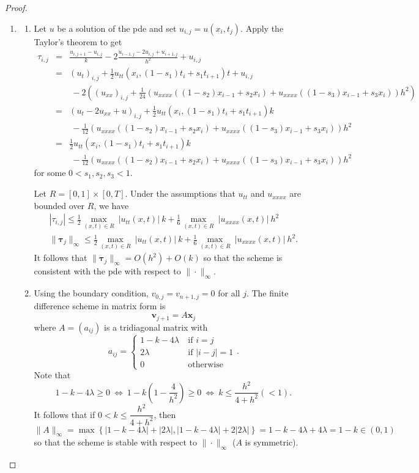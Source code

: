 \documentclass[a4paper,12pt]{article}
\begin{document}
\begin{enumerate}
\begin{proof}
\begin{enumerate}
\item 
\begin{enumerate}[label=(\roman*)]
\item Let $u$ be a solution of the pde and set $u_{i,j}=u(x_i,t_j)$. Apply the Taylor's theorem to get
\begin{eqnarray*}
\tau_{i,j} &=& \frac{u_{i,j+1}-u_{i,j}}k - 2 \frac{u_{i-1,j}-2u_{i,j}+u_{i+1,j}}{h^2} + u_{i,j}\\
&=& (u_t)_{i,j} + \frac 12 u_{tt}(x_i,(1-s_1)t_i+s_1t_{i+1}) t  + u_{i,j} \\
&&\ - 2 \left( 
(u_{xx})_{i,j} + \frac 1{24} \left( u_{xxxx}((1-s_2)x_{i-1}+s_2x_i) + u_{xxxx}((1-s_3)x_{i-1}+s_3x_i) \right) h^2 \right)\\
&=& (u_t-2u_{xx}+u)_{i,j} + \frac 12 u_{tt}(x_i,(1-s_1)t_i+s_1t_{i+1}) k\\
&&\ - \frac 1{12} \left( u_{xxxx}((1-s_2)x_{i-1}+s_2 x_i) + u_{xxxx}((1-s_3)x_{i-1}+s_3 x_i) \right) h^2 \\
&=& \frac 12 u_{tt}(x_i,(1-s_1)t_i+s_1t_{i+1}) k\\
&&\ - \frac 1{12} \left( u_{xxxx}((1-s_2)x_{i-1}+s_2 x_i) + u_{xxxx}((1-s_3)x_{i-1}+s_3 x_i) \right) h^2
\end{eqnarray*}
for some $0 < s_1,s_2,s_3 < 1$.

Let $R=[0,1]\times[0,T]$. Under the assumptions that $u_{tt}$ and $u_{xxxx}$ are bounded over $R$, we have
\begin{gather*}
|\tau_{i,j}| \le \frac 12 \max_{(x,t)\in R}\ |u_{tt}(x,t)|\ k + \frac 16 \max_{(x,t)\in R}\ |u_{xxxx}(x,t)|\ h^2\\
\|\boldsymbol\tau_j\|_\infty \le \frac 12 \max_{(x,t)\in R}\ |u_{tt}(x,t)|\ k + \frac 16 \max_{(x,t)\in R}\ |u_{xxxx}(x,t)|\ h^2.
\end{gather*}
It follows that $\|\boldsymbol\tau_j\|_\infty=O(h^2)+O(k)$ so that the scheme is consistent with the pde with respect to $\|\cdot\|_\infty$.

\item Using the boundary condition, $v_{0,j} = v_{n+1,j} = 0$ for all $j$. The finite difference scheme in matrix form is
\[ \mathbf v_{j+1} = A\mathbf x_j \]
where $A=(a_{ij})$ is a tridiagonal matrix with
\[ a_{ij} = \left\{ \begin{array}{ll}
1-k-4\lambda &\ \mbox{if $i=j$}\\
2\lambda &\ \mbox{if $|i-j|=1$}\\
0 &\ \mbox{otherwise}
\end{array}\right.. \]
Note that
\[ 1-k-4\lambda \ge 0 \ \iff\ 1-k\left(1-\frac 4{h^2}\right) \ge 0 \ \iff\ k \le \frac{h^2}{4+h^2} (<1). \]
It follows that if $0 < k \le \dfrac{h^2}{4+h^2}$, then
\[ \|A\|_\infty = \max\left\{ |1-k-4\lambda|+|2\lambda|,|1-k-4\lambda|+2|2\lambda| \right\} = 1-k-4\lambda+4\lambda = 1-k \in (0,1) \]
so that the scheme is stable with respect to $\|\cdot\|_\infty$ ($A$ is symmetric).


\end{enumerate}
\end{enumerate}
\end{proof}
\end{enumerate}
\end{document}
